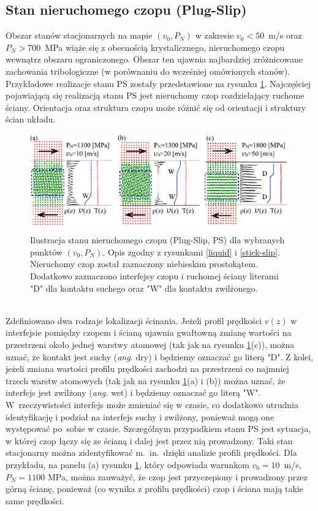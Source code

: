 \documentclass[12pt,a4paper,openright]{report} %
\begin{document}
\subsection{Stan nieruchomego czopu (Plug-Slip)}
Obszar stanów stacjonarnych na mapie $(v_0, P_N)$ w zakresie $v_0<50$~m/s \linebreak oraz~$P_N>700$~MPa wiąże się z obecnością krystalicznego, nieruchomego czopu \linebreak wewnątrz obszaru ograniczonego. Obszar ten ujawnia najbardziej zróżnicowane zachowania tribologiczne (w porównaniu do wcześniej omówionych stanów). Przykładowe realizacje stanu PS zostały przedstawione na rysunku \ref{ps-state}. Najczęściej pojawiającą się realizacją stanu PS jest nieruchomy czop rozdzielający ruchome ściany. Orientacja oraz struktura czopu może różnić się od orientacji i struktury ścian układu.
%
\begin{figure}[h]
\centering
\includegraphics[width=160mm]{rysunki/PRE16_fig6.pdf}
\caption{Ilustracja stanu nieruchomego czopu (Plug-Slip, PS) dla wybranych punktów $(v_0, P_N)$. Opis zgodny z rysunkami \ref{liquid} i \ref{stick-slip}. Nieruchomy czop został zaznaczony niebieskim prostokątem. Dodatkowo zaznaczono interfejsy czopu i ruchomej ściany literami "D" dla kontaktu suchego oraz "W" dla kontaktu zwilżonego.}
\label{ps-state}
\end{figure}
%
%
\\
Zdefiniowano dwa rodzaje lokalizacji ścinania. Jeżeli profil prędkości $v(z)$ w interfejsie pomiędzy czopem i ścianą ujawnia gwałtowną zmianę wartości na przestrzeni około jednej warstwy atomowej (tak jak na rysunku \ref{ps-state}(c)), można uznać, że kontakt jest suchy (\textit{ang.} dry) i będziemy oznaczać go literą "D". Z kolei, jeżeli zmiana wartości profilu prędkości zachodzi na przestrzeni co najmniej trzech warstw atomowych (tak jak na rysunku \ref{ps-state}(a) i (b)) można uznać, że interfejs jest zwilżony (\textit{ang.} wet) i będziemy oznaczać go literą "W". W~rzeczywistości interfejs może zmieniać się w czasie, co dodatkowo utrudnia identyfikację i podział na interfejs suchy i zwilżony, ponieważ mogą one występować po~sobie w czasie. Szczególnym przypadkiem stanu PS jest sytuacja, w której czop łączy się ze ścianą i dalej jest przez nią prowadzony. Taki stan stacjonarny można zidentyfikować m.~in.~dzięki analizie profili prędkości. Dla przykładu, na panelu (a) rysunku \ref{ps-state}, który odpowiada warunkom $v_0=10$~m/s, $P_N=1100$ MPa, można zauważyć, że czop jest przyczepiony i prowadzony przez górną ścianę, ponieważ (co wynika z profilu prędkości) czop i ściana mają takie same prędkości.
\end{document}

